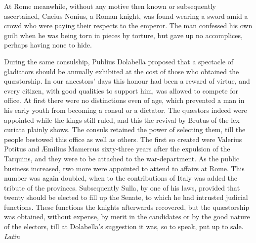 
At Rome meanwhile, without any motive then known or subsequently ascertained, Cneius Nonius, a Roman knight, was found wearing a sword amid a crowd who were paying their respects to the emperor. The man confessed his own guilt when he was being torn in pieces by torture, but gave up no accomplices, perhaps having none to hide.

During the same consulship, Publius Dolabella proposed that a spectacle of gladiators should be annually exhibited at the cost of those who obtained the quæstorship. In our ancestors' days this honour had been a reward of virtue, and every citizen, with good qualities to support him, was allowed to compete for office. At first there were no distinctions even of age, which prevented a man in his early youth from becoming a consul or a dictator. The quæstors indeed were appointed while the kings still ruled, and this the revival by Brutus of the lex curiata plainly shows. The consuls retained the power of selecting them, till the people bestowed this office as well as others. The first so created were Valerius Potitus and Æmilius Mamercus sixty-three years after the expulsion of the Tarquins, and they were to be attached to the war-department. As the public business increased, two more were appointed to attend to affairs at Rome. This number was again doubled, when to the contributions of Italy was added the tribute of the provinces. Subsequently Sulla, by one of his laws, provided that twenty should be elected to fill up the Senate, to which he had intrusted judicial functions. These functions the knights afterwards recovered, but the quæstorship was obtained, without expense, by merit in the candidates or by the good nature of the electors, till at Dolabella's suggestion it was, so to speak, put up to sale. \emph{Latin}


